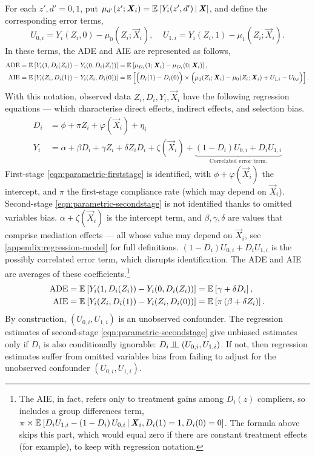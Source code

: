 For each $z',d' = 0,1$, put $\mu_{d'}(z'; \boldsymbol{\mathit{X}}_i) = \mathbb{E}_{} \left[ Y_i(z', d') \, \middle\vert \, \boldsymbol{\mathit{X}} \right]$, and define the corresponding error terms,
\[ U_{0,i} = Y_i(Z_i, 0) - \mu_0(Z_i; \vec X_i),\;\;\;\;
U_{1,i} = Y_i(Z_i, 1) - \mu_1(Z_i; \vec X_i). \]
In these terms, the ADE and AIE are represented as follows,
\begin{align*}
    \text{ADE}
    = \mathbb{E}_{} \left[ Y_i(1, D_i(Z_i)) - Y_i(0, D_i(Z_i)) \right]
    &= \mathbb{E}_{} \left[  \mu_{D_i}(1; \boldsymbol{\mathit{X}}_i) - \mu_{D_i}(0; \boldsymbol{\mathit{X}}_i) \right], \\
    \text{AIE}
    = \mathbb{E}_{} \left[ Y_i(Z_i, D_i(1)) - Y_i(Z_i, D_i(0)) \right]
        &= \mathbb{E}_{} \left[ \Big( D_i(1) - D_i(0) \Big)
        \times \Big( \mu_1(Z_i; \boldsymbol{\mathit{X}}_i) - \mu_0(Z_i; \boldsymbol{\mathit{X}}_i) + U_{1,i} - U_{0,i}\Big)  \right].
\end{align*}
With this notation, observed data $Z_i, D_i, Y_i, \vec X_i$ have the following regression equations --- which characterise direct effects, indirect effects, and selection bias.
\begin{align}
    \label{eqn:parametric-firststage}
    D_i &= \phi + \pi Z_i + \varphi(\vec X_i) + \eta_i  \\
    \label{eqn:parametric-secondstage}
    Y_i &= \alpha + \beta D_i + \gamma Z_i + \delta Z_i D_i
    + \zeta(\vec X_i)
    + \underbrace{\left(1 - D_i \right)U_{0,i} + D_i U_{1,i}}_{
        \text{Correlated error term.}}
\end{align}
First-stage \eqref{eqn:parametric-firststage} is identified, with $\phi + \varphi(\vec X_i)$ the intercept, and $\pi$ the first-stage compliance rate (which may depend on $\vec X_i$).
Second-stage \eqref{eqn:parametric-secondstage} is not identified thanks to omitted variables bias.
$\alpha + \zeta(\vec X_i)$ is the intercept term, and $\beta, \gamma, \delta$ are values that comprise mediation effects --- all whose value may depend on $\vec X_i$, see \autoref{appendix:regression-model} for full definitions.
$\left(1 - D_i \right)U_{0,i} + D_i U_{1,i}$ is the possibly correlated error term, which disrupts identification.
The ADE and AIE are averages of these coefficients.\footnote{
    The AIE, in fact, refers only to treatment gains among $D_i(z)$ compliers, so includes a group differences term, $\pi \times\mathbb{E}_{} \left[ 
            D_i U_{1,i} - \left(1 - D_i \right)U_{0,i}
         \, \middle\vert \, \boldsymbol{\mathit{X}}_i, D_i(1) = 1, D_i(0) = 0 \right] $.
    The formula above skips this part, which would equal zero if there are constant treatment effects (for example), to keep with regression notation.
}
\begin{align*}
    \text{ADE}
    = \mathbb{E}_{} \left[ Y_i(1, D_i(Z_i)) - Y_i(0, D_i(Z_i)) \right]
        &= \mathbb{E}_{} \left[ \gamma + \delta D_i \right], \\
    \text{AIE} 
    = \mathbb{E}_{} \left[ Y_i(Z_i, D_i(1)) - Y_i(Z_i, D_i(0)) \right]
        &= \mathbb{E}_{} \left[  \pi \left( \beta +  \delta Z_i \right) \right].
\end{align*}
By construction, $\left(U_{0, i}, U_{1, i} \right)$ is an unobserved confounder.
The regression estimates of second-stage \eqref{eqn:parametric-secondstage} give unbiased estimates only if $D_i$ is also conditionally ignorable: $D_i \indep  \left(U_{0, i}, U_{1, i} \right)$.
If not, then regression estimates suffer from omitted variables bias from failing to adjust for the unobserved confounder $\left(U_{0, i}, U_{1, i} \right)$.

